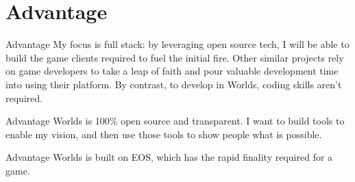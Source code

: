 \documentclass[final, xcolor=pdftex, dvipsnames, table, aspectratio=169, 14pt]{beamer}
\begin{document}
%

\section{Advantage}
\begin{frame}{Advantage}
My focus is full stack: by leveraging open source tech, I will be able to build the game clients required to fuel the initial fire. Other similar projects rely on game developers to take a leap of faith and pour valuable development time into using their platform. By contrast, to develop in Worlds, coding skills aren't required. 
\end{frame}

\begin{frame}{Advantage}
Worlds is 100\% open source and transparent. I want to build tools to enable my vision, and then use those tools to show people what is possible.
\end{frame}

\begin{frame}{Advantage}
Worlds is built on EOS, which has the rapid finality required for a game. 
\end{frame}

\end{document}
